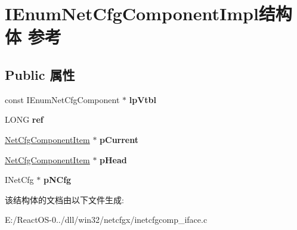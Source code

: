 \hypertarget{struct_i_enum_net_cfg_component_impl}{}\section{I\+Enum\+Net\+Cfg\+Component\+Impl结构体 参考}
\label{struct_i_enum_net_cfg_component_impl}
\subsection*{Public 属性}
\begin{DoxyCompactItemize}
\item 
\mbox{\label{struct_i_enum_net_cfg_component_impl_a3bdb46e47aaf36874b09f043be7d1acd}} 
const I\+Enum\+Net\+Cfg\+Component $\ast$ {\bfseries lp\+Vtbl}
\item 
\mbox{\label{struct_i_enum_net_cfg_component_impl_a9228712e666fbf73f4851ec770f9c35e}} 
L\+O\+NG {\bfseries ref}
\item 
\mbox{\label{struct_i_enum_net_cfg_component_impl_ab5e853dabb00fcad85e49ce9640e42f9}} 
\hyperlink{structtag_net_cfg_component_item}{Net\+Cfg\+Component\+Item} $\ast$ {\bfseries p\+Current}
\item 
\mbox{\label{struct_i_enum_net_cfg_component_impl_a1311f7116685be68c2c0af3233066d57}} 
\hyperlink{structtag_net_cfg_component_item}{Net\+Cfg\+Component\+Item} $\ast$ {\bfseries p\+Head}
\item 
\mbox{\label{struct_i_enum_net_cfg_component_impl_ac70c264dfe0e35e24d307a75adb82753}} 
I\+Net\+Cfg $\ast$ {\bfseries p\+N\+Cfg}
\end{DoxyCompactItemize}


该结构体的文档由以下文件生成\+:\begin{DoxyCompactItemize}
\item 
E\+:/\+React\+O\+S-\/0../dll/win32/netcfgx/inetcfgcomp\+\_\+iface.\+c\end{DoxyCompactItemize}
